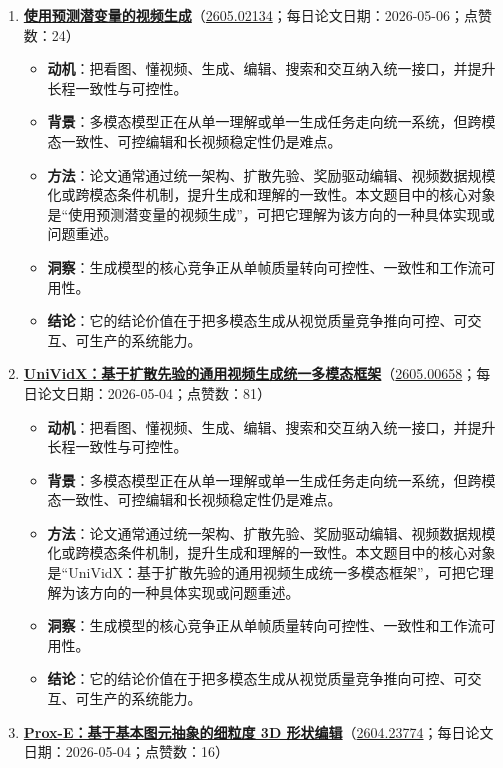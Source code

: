 \begin{enumerate}[leftmargin=1.5em]
\begin{itemize}[leftmargin=1.5em]
  \end{itemize}
  \item \textbf{\href{https://huggingface.co/papers/2605.02134}{使用预测潜变量的视频生成}}（\href{https://arxiv.org/abs/2605.02134}{2605.02134}；每日论文日期：2026-05-06；点赞数：24）
  \begin{itemize}[leftmargin=1.5em]
    \item \textbf{动机}：把看图、懂视频、生成、编辑、搜索和交互纳入统一接口，并提升长程一致性与可控性。
    \item \textbf{背景}：多模态模型正在从单一理解或单一生成任务走向统一系统，但跨模态一致性、可控编辑和长视频稳定性仍是难点。
    \item \textbf{方法}：论文通常通过统一架构、扩散先验、奖励驱动编辑、视频数据规模化或跨模态条件机制，提升生成和理解的一致性。本文题目中的核心对象是“使用预测潜变量的视频生成”，可把它理解为该方向的一种具体实现或问题重述。
    \item \textbf{洞察}：生成模型的核心竞争正从单帧质量转向可控性、一致性和工作流可用性。
    \item \textbf{结论}：它的结论价值在于把多模态生成从视觉质量竞争推向可控、可交互、可生产的系统能力。
  \end{itemize}
  \item \textbf{\href{https://huggingface.co/papers/2605.00658}{UniVidX：基于扩散先验的通用视频生成统一多模态框架}}（\href{https://arxiv.org/abs/2605.00658}{2605.00658}；每日论文日期：2026-05-04；点赞数：81）
  \begin{itemize}[leftmargin=1.5em]
    \item \textbf{动机}：把看图、懂视频、生成、编辑、搜索和交互纳入统一接口，并提升长程一致性与可控性。
    \item \textbf{背景}：多模态模型正在从单一理解或单一生成任务走向统一系统，但跨模态一致性、可控编辑和长视频稳定性仍是难点。
    \item \textbf{方法}：论文通常通过统一架构、扩散先验、奖励驱动编辑、视频数据规模化或跨模态条件机制，提升生成和理解的一致性。本文题目中的核心对象是“UniVidX：基于扩散先验的通用视频生成统一多模态框架”，可把它理解为该方向的一种具体实现或问题重述。
    \item \textbf{洞察}：生成模型的核心竞争正从单帧质量转向可控性、一致性和工作流可用性。
    \item \textbf{结论}：它的结论价值在于把多模态生成从视觉质量竞争推向可控、可交互、可生产的系统能力。
  \end{itemize}
  \item \textbf{\href{https://huggingface.co/papers/2604.23774}{Prox-E：基于基本图元抽象的细粒度 3D 形状编辑}}（\href{https://arxiv.org/abs/2604.23774}{2604.23774}；每日论文日期：2026-05-04；点赞数：16）

\end{enumerate}
